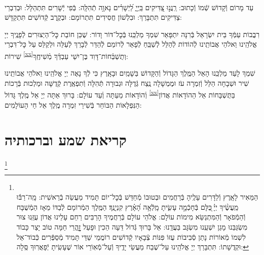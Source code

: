 \documentclass[twoside, openany, parskip=half, 11pt]{book}
\begin{document}
\\
 עַד מָרוֹם וְֿקָדוֹשׁ שְֿׁמוֹ וְֿכָתוּב: רַֽנֲנ֣וּ צַ֭דִּיקִים בַּֽיְיָ֑ לַ֝יְשָׁרִ֗ים נָאוָ֥ה תְֿהִלָּֽה: בְּֿפִי יְֿשָׁרִים תִּתְהַלָּל: וּבְדִבְרֵי צַדִּיקִים תִּתְבָּרַךְ: וּבִלְשׁוֹן חֲסִידִים תִּתְרוֹמָם: וּבְקֶֽרֶב קְֿדוֹשִׁים תִּתְקַדָּשׁ:

 רִבֲבוֹת עַמְּֿךָ בֵּית יִשְׂרָאֵל בְּֿרִנָּה יִתְפָּאַר שִׁמְךָ מַלְכֵּֽנוּ בְּֿכׇל־דּוֹר וָדוֹר: שֶׁכֵּן חוֹבַת כׇּל־הַיְצוּרִים לְֿפָנֶֽיךָ יְיָ אֱלֹהֵֽינוּ וֵאלֹהֵי אֲבוֹתֵֽינוּ לְֿהוֹדוֹת לְֿהַלֵּל לְֿשַׁבֵּֽחַ לְֿפָאֵר לְֿרוֹמֵם לְֿהַדֵּר לְֿבָרֵךְ לְֿעַלֵּה וּלְקַלֵּס עַל כׇּל־דִּבְרֵי שִׁירוֹת \textsuperscript{\ref{xx}}וְתֻשְׁבְּֿחוֹת־דָּוִד בֶּן־יִשַׁי עַבְדְּֿךָ מְֿשִׁיחֶֽךָ:


 שִׁמְךָ לָעַד מַלְכֵּֽנוּ הָאֵל הַמֶּֽלֶךְ הַגָּדוֹל וְֿהַקָּדוֹשׁ בַּשָׁמַֽיִם וּבָאָֽרֶץ כִּי לְֿךָ נָאֶה יְיָ אֱלֹהֵֽינוּ וֵאלֹהֵי אֲבוֹתֵֽינוּ שִׁיר וּשְׁבָחָה הַלֵּל וְֿזִמְרָה עֹז וּמֶמְשָׁלָה נֶֽצַח גְּֿדֻלָּה וּגְבוּרָה תְּֿהִלָּה וְֿתִפְאֶֽרֶת קְֿדֻשָּׁה וּמַלְכוּת בְּֿרָכוֹת וְֿהוֹדָאוֹת מֵעַתָּה וְֿעַד עוֹלָם:
 בָּרוּךְ אַתָּה יְיָ אֵל מֶֽלֶךְ גָּדוֹל \textsuperscript{\ref{xx}}בַּתֻּשְׁבָּחוֹת אֵל הַהוֹדָאוֹת אֲדוֹן הַנִּפְלָאוֹת הַבּוֹחֵר בְּֿשִׁירֵי זִמְרָה מֶֽלֶךְ אֵל חַי הָעוֹלָמִים:
\mimaamakim
\halfkaddish

\section*{ קריאת שמע וברכותיה }

\barachu


\footnote{\\
הַמֵּאִיר לָאָֽרֶץ וְֿלַדָּרִים עָלֶֽיהָ בְּֿרַחֲמִים וּבְטוּבוֹ מְֿחַדֵּשׁ בְּֿכׇל־יוֹם תָּמִיד מַעֲשֵׂה בְֿרֵאשִׁית:
 מָֽה־רַבּ֬וּ מַֽעֲשֶׂ֨יךָ יְיָ֗ ֖כֻּלָּם בְּֿחָכְֿמָ֣ה עָשִׂ֑יתָ מָֽלְֿאָ֥ה הָ֝אָ֗רֶץ קִנְיָנֶֽךָ׃ הַמֶּֽלֶךְ הַמְֿרוֹמָם לְֿבַדּוֹ מֵאָז הַמְֿשֻׁבָּח וְֿהַמְֿפֹאָר וְֿהַמִּתְנַשֵּׂא מִימוֹת עוֹלָם: אֱלֹהֵי עוֹלָם בְּֿרַחֲמֶיךָ הָרַבִּים רַחֵם עָלֵינוּ אֲדוֹן עֻזֵּֽנוּ צוּר מִשְׂגַּבֵּנוּ מָגֵן יִשְׁעֵֽנוּ מִשְׂגָּב בַּעֲדֵֽנוּ: אֵל בָּרוּךְ גְּֿדוֹל דֵּעָה הֵכִין וּפָעַל זׇׇׇׇׇׇׇׇָהֳרֵי חַמָּה טוֹב יָצַר כָּבוֹד לִשְׁמוֹ מְֿאוֹרוֹת נָתַן סְֿבִיבוֹת עֻזּוֹ פִּנּוֹת צְֿבָאָיו קְֿדוֹשִׁים רוֹמֲמֵי שַׁדַּי תָּמִיד מְֿסַפְּֿרִים כְּֿבוֹד־אֵל וּקְדֻשָׁתוֹ: תִּתְבָּרַךְ יְיָ אֱלֹהֵֽינוּ עַל־שֶׁבַח מַעֲשֵׂי יָדֶֽיךָ וְֿעַל־מְֿאֽוֹרֵי אוֹר שֶׁעָשִֽׂיתָ יְֿפָאֲרֽוּךָ סֶּֽלָה:
}
\end{document}

